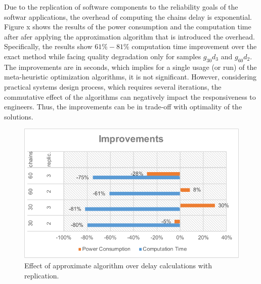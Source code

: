 Due to the replication of software components to the reliability goals of the softwar applications, the overhead of computing the chains delay is exponential. Figure x shows the results of the power consumption and the computation time after afer applying the approximation algorithm that is introduced the overhead. Specifically, the results show $61\%-81\%$ computation time improvement over the exact method while facing quality degradation only for samples $g_{30}d_{3}$ and  $g_{60}d_{2}$. The improvements are in seconds, which implies for a single usage (or run) of the meta-heuristic optimization algorithms, it is not significant. However, considering practical systems design process, which requires several iterations, the commutative effect of the algorithms can negatively impact the responsiveness to engineers. Thus, the improvements can be in trade-off with optimality of the solutions.
\begin{figure}
	\centering
	\includegraphics[width=0.7\linewidth]{images/chains_replication_improvements}
	\caption{Effect of approximate algorithm over delay calculations with replication.}
	\label{fig_chainsreplicationimprovements}
\end{figure}